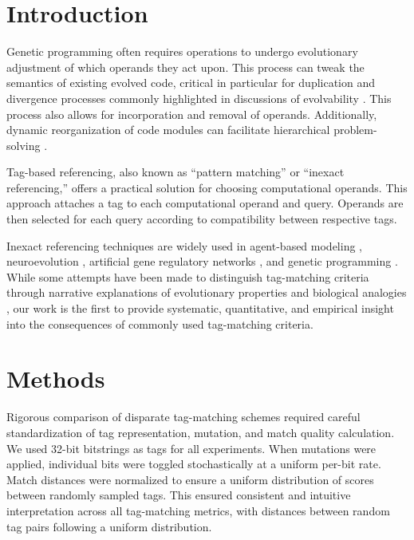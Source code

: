 \section{Introduction} \label{sec:introduction}

Genetic programming often requires operations to undergo evolutionary adjustment of which operands they act upon.
This process can tweak the semantics of existing evolved code, critical in particular for duplication and divergence processes commonly highlighted in discussions of evolvability \citep{altenberg1994evolution}.
This process also allows for incorporation and removal of operands.
Additionally, dynamic reorganization of code modules can facilitate hierarchical problem-solving \citep{Kinnear:Koza:1994:adf}.

Tag-based referencing, also known as ``pattern matching'' or ``inexact referencing,'' offers a practical solution for choosing computational operands.
This approach attaches a tag to each computational operand and query.
Operands are then selected for each query according to compatibility between respective tags.

Inexact referencing techniques are widely used in agent-based modeling \citep{riolo2001evolution}, neuroevolution \citep{reisinger2007acquiring}, artificial gene regulatory networks \citep{banzhaf2003artificial}, and genetic programming \citep{spector2011tag, lalejini2018evolving}.
While some attempts have been made to distinguish tag-matching criteria through narrative explanations of evolutionary properties and biological analogies \citep{downing2015intelligence,scherer2004activation}, our work is the first to provide systematic, quantitative, and empirical insight into the consequences of commonly used tag-matching criteria.

\section{Methods}

Rigorous comparison of disparate tag-matching schemes required careful standardization of tag representation, mutation, and match quality calculation.
We used 32-bit bitstrings as tags for all experiments.
When mutations were applied, individual bits were toggled stochastically at a uniform per-bit rate.
Match distances were normalized to ensure a uniform distribution of scores between randomly sampled tags.
This ensured consistent and intuitive interpretation across all tag-matching metrics, with distances between random tag pairs following a uniform distribution.

